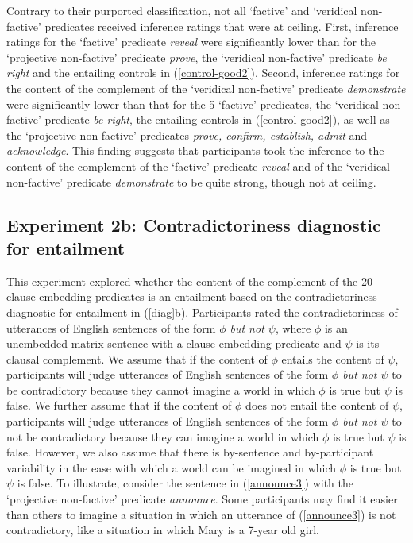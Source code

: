 \documentclass[11pt,fleqn]{article}
\newcommand{\6}{\mbox{$[\hspace*{-.6mm}[$}}
\newcommand{\9}{\mbox{$]\hspace*{-.6mm}]$}}
\begin{document}
Contrary to their purported classification, not all `factive' and `veridical non-factive' predicates received inference ratings that were at ceiling. First, inference ratings for the `factive' predicate {\em reveal} were significantly lower than for the `projective non-factive' predicate {\em prove}, the `veridical non-factive' predicate {\em be right} and the entailing controls in (\ref{control-good2}). Second, inference ratings for the content of the complement of the `veridical non-factive' predicate {\em demonstrate} were significantly lower than that for the 5 `factive' predicates, the `veridical non-factive' predicate {\em be right}, the entailing controls in (\ref{control-good2}), as well as the `projective non-factive' predicates {\em prove, confirm, establish, admit} and {\em acknowledge}. This finding suggests that participants took the inference to the content of the complement of  the `factive' predicate {\em reveal} and of the `veridical non-factive' predicate {\em demonstrate} to be quite strong, though not at ceiling.  

\subsection{Experiment 2b: Contradictoriness diagnostic for entailment}\label{s32}

This experiment explored whether the content of the complement of the 20 clause-embedding predicates is an entailment based on the contradictoriness diagnostic for entailment in (\ref{diag}b). Participants rated the contradictoriness of utterances of English sentences of the form {\em $\phi$ but not $\psi$}, where $\phi$ is an unembedded matrix sentence with a clause-embedding predicate and $\psi$ is its clausal complement. We assume that if the content of $\phi$ entails the content of $\psi$, participants will judge utterances of English sentences of the form {\em $\phi$ but not $\psi$}  to be contradictory because they cannot imagine a world in which $\phi$ is true but $\psi$ is false. We further assume that if the content of $\phi$ does not entail the content of $\psi$, participants will judge utterances of English sentences of the form {\em $\phi$ but not $\psi$}  to not be contradictory because they can imagine a world in which $\phi$ is true but $\psi$ is false. However, we also assume that there is by-sentence and by-participant variability in the ease with which a world can be imagined in which $\phi$ is true but $\psi$ is false. To illustrate, consider the sentence in (\ref{announce3}) with the `projective non-factive' predicate {\em announce}. Some participants may find it easier than others to imagine a situation in which an utterance of (\ref{announce3}) is not contradictory, like a situation in which Mary is a 7-year old girl. 
\end{document}
